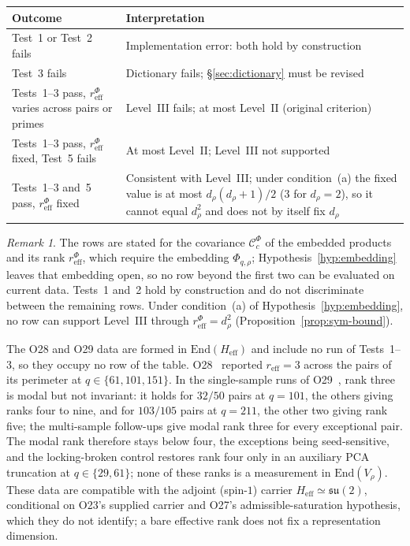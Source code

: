\documentclass[12pt,a4paper]{article}
\theoremstyle{definition}
\theoremstyle{remark}
\newtheorem{remark}[theorem]{Remark}
\begin{document}
    \begin{center}
      \begin{tabular}{p{}|p{}}
        \hline
        Outcome & Interpretation \\
        \hline
        Test~1 or Test~2 fails & Implementation error: both hold by construction \\
        Test~3 fails & Dictionary fails; §\ref{sec:dictionary} must be revised \\
        Tests~1--3 pass, $r^{\Phi}_{\mathrm{eff}}$ varies across pairs or primes & Level~III fails; at most
        Level~II (original criterion) \\
        Tests~1--3 pass, $r^{\Phi}_{\mathrm{eff}}$ fixed, Test~5 fails & At most Level~II; Level~III not
        supported \\
        Tests~1--3 and~5 pass, $r^{\Phi}_{\mathrm{eff}}$ fixed & Consistent with Level~III; under condition~(a) the
        fixed value is at most $d_\rho(d_\rho+1)/2$ ($3$ for $d_\rho = 2$), so it cannot equal $d_\rho^2$
        and does not by itself fix $d_\rho$ \\
        \hline
      \end{tabular}
    \end{center}

    \begin{remark}
      The rows are stated for the covariance $\mathcal{C}^{\Phi}_c$ of the embedded products and its rank
      $r^{\Phi}_{\mathrm{eff}}$, which require the embedding $\Phi_{q,\rho}$; Hypothesis~\ref{hyp:embedding}
      leaves that embedding open, so no row beyond the first two can be evaluated on current data.
      Tests~1 and~2 hold by construction and do not discriminate between the remaining rows.
      Under condition~(a) of Hypothesis~\ref{hyp:embedding}, no row can support Level~III through
      $r^{\Phi}_{\mathrm{eff}} = d_\rho^2$ (Proposition~\ref{prop:sym-bound}).

      The O28 and O29 data are formed in $\mathrm{End}(H_{\mathrm{eff}})$ and include no run of
      Tests~1--3, so they occupy no row of the table.
      O28~\cite{Beau2026a32} reported $r_{\mathrm{eff}} = 3$ across the pairs of its perimeter at
      $q \in \{61, 101, 151\}$.
      In the single-sample runs of O29~\cite{Beau2026a33}, rank three is modal but not invariant: it holds
      for $32/50$ pairs at $q = 101$, the others giving ranks four to nine, and for $103/105$ pairs at
      $q = 211$, the other two giving rank five; the multi-sample follow-ups give modal rank three for
      every exceptional pair.
      The modal rank therefore stays below four, the exceptions being seed-sensitive, and the
      locking-broken control restores rank four only in an auxiliary PCA truncation at $q \in \{29, 61\}$;
      none of these ranks is a measurement in $\mathrm{End}(V_\rho)$.
      These data are compatible with the adjoint (spin-$1$) carrier $H_{\mathrm{eff}} \simeq \mathfrak{su}(2)$,
      conditional on O23's supplied carrier and O27's admissible-saturation hypothesis, which they do not
      identify; a bare effective rank does not fix a representation dimension.
    \end{remark}
\end{document}
